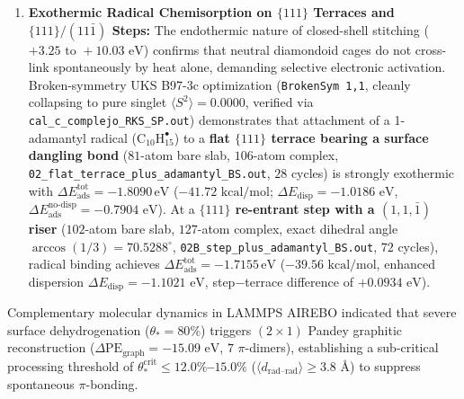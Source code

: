 \documentclass[10pt,twocolumn,a4paper]{article}
\begin{document}
\begin{enumerate}
    \item \textbf{Exothermic Radical Chemisorption on $\{111\}$ Terraces and $\{111\}/(11\bar{1})$ Steps:} The endothermic nature of closed-shell stitching ($+3.25\text{ to }+10.03\text{ eV}$) confirms that neutral diamondoid cages do not cross-link spontaneously by heat alone, demanding selective electronic activation. Broken-symmetry UKS B97-3c optimization (\texttt{BrokenSym 1,1}, cleanly collapsing to pure singlet $\langle S^2\rangle = 0.0000$, verified via \texttt{cal\_c\_complejo\_RKS\_SP.out}) demonstrates that attachment of a 1-adamantyl radical ($\text{C}_{10}\text{H}_{15}^\bullet$) to a \textbf{flat $\{111\}$ terrace bearing a surface dangling bond} ($81$-atom bare slab, $106$-atom complex, \texttt{02\_flat\_terrace\_plus\_adamantyl\_BS.out}, $28$ cycles) is strongly exothermic with $\Delta E_{\text{ads}}^{\text{tot}} = \mathbf{-1.8090}\,\text{eV}$ ($-41.72\text{ kcal/mol}$; $\Delta E_{\text{disp}} = -1.0186\text{ eV}$, $\Delta E_{\text{ads}}^{\text{no-disp}} = -0.7904\text{ eV}$). At a \textbf{$\{111\}$ re-entrant step with a $(1,1,\bar{1})$ riser} ($102$-atom bare slab, $127$-atom complex, exact dihedral angle $\arccos(1/3) = 70.5288^\circ$, \texttt{02B\_step\_plus\_adamantyl\_BS.out}, $72$ cycles), radical binding achieves $\Delta E_{\text{ads}}^{\text{tot}} = \mathbf{-1.7155}\,\text{eV}$ ($-39.56\text{ kcal/mol}$, enhanced dispersion $\Delta E_{\text{disp}} = -1.1021\text{ eV}$, step$-$terrace difference of $+0.0934\text{ eV}$).
\end{enumerate}

Complementary molecular dynamics in LAMMPS AIREBO indicated that severe surface dehydrogenation ($\theta_* = 80\%$) triggers $(2\times 1)$ Pandey graphitic reconstruction \cite{Pandey1981} ($\Delta\text{PE}_{\text{graph}} = -15.09\text{ eV}$, $7$ $\pi$-dimers), establishing a sub-critical processing threshold of \textbf{$\theta_*^{\text{crit}} \le 12.0\%$--$15.0\%$} ($\langle d_{\text{rad--rad}}\rangle \ge 3.8\text{ \AA}$) to suppress spontaneous $\pi$-bonding.
\end{document}

